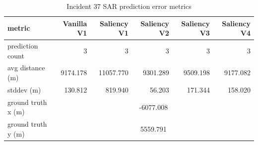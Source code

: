 \begin{table}[ht]
\centering
\caption{Incident 37 SAR prediction error metrics}
\label{tab:sar-incident-37}
\begin{tabular}{lrrrrr}
\hline
metric & Vanilla V1 & Saliency V1 & Saliency V2 & Saliency V3 & Saliency V4 \\
\hline
prediction count & 3 & 3 & 3 & 3 & 3 \\
avg distance (m) & 9174.178 & 11057.770 & 9301.289 & 9509.198 & 9177.082 \\
stddev (m) & 130.812 & 819.940 & 56.203 & 171.344 & 158.020 \\
ground truth x (m) & \multicolumn{5}{c}{-6077.008} \\
ground truth y (m) & \multicolumn{5}{c}{5559.791} \\
\hline
\end{tabular}
\end{table}
